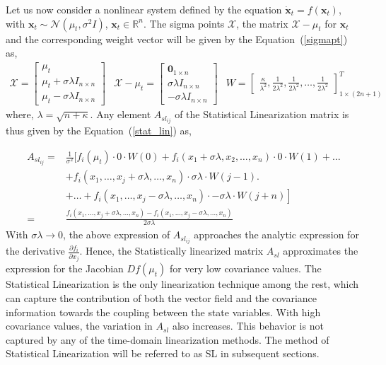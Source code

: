Let us now consider a nonlinear system defined by the equation $\dot{\textbf{x}}_t = f(\textbf{x}_t)$, with $\textbf{x}_t \sim \mathcal{N}(\mu_t,\sigma^2 I)$, $\textbf{x}_t \in \mathbb{R}^n$. The sigma points $\mathcal{X}$, the matrix $\mathcal{X} -\mu_t$ for $\textbf{x}_t$ and the corresponding weight vector will be given by the Equation~(\ref{sigmapt}) as,
\begin{equation}
\begin{array}{lcr}
\mathcal{X} = \begin{bmatrix}
\mu_t \\
\mu_t + \sigma  \lambda I_{n \times n} \\
\mu_t - \sigma \lambda I_{n \times n}
\end{bmatrix} &
\mathcal{X} - \mu_t =  \begin{bmatrix}
\textbf{0}_{1 \times n} \\
\sigma \lambda I_{n \times n} \\
- \sigma \lambda I_{n \times n}
\end{bmatrix}  &
 W = \begin{bmatrix}
\frac{\kappa}{\lambda^2}, \frac{1}{2\lambda^2}, \frac{1}{2\lambda^2}, \ldots , \frac{1}{2\lambda^2}
\end{bmatrix}^T_{1 \times (2n + 1)}
\end{array}
\end{equation} 
\noindent where, $\lambda = \sqrt{n+ \kappa}$. Any element $A_{{sl}_{ij}}$ of the Statistical Linearization matrix is thus given by the Equation~(\ref{stat_lin}) as,

\begin{equation}
\begin{array}{rl}
A_{{sl}_{ij}} = & \frac{1}{\sigma^2} \bigl[f_i(\mu_t)\cdot 0 \cdot W(0) + f_i(x_1 + \sigma \lambda,x_2,\ldots,x_n)\cdot 0 \cdot W(1) + \ldots \\
& + f_i(x_1 ,\ldots,x_j + \sigma \lambda,\ldots, x_n)\cdot \sigma \lambda \cdot W(j-1) \bigr.\\
& \left. + \ldots + f_i(x_1 ,\ldots,x_j - \sigma \lambda,\ldots, x_n) \cdot - \sigma \lambda \cdot W(j + n) \right] \\
= & \frac{f_i(x_1 ,\ldots,x_j + \sigma \lambda,\ldots, x_n) - f_i(x_1 ,\ldots,x_j - \sigma \lambda,\ldots, x_n)}{2 \sigma \lambda}
\end{array}
\end{equation}
\noindent With $\sigma \lambda \rightarrow 0$, the above expression of $A_{{sl}_{ij}}$ approaches the analytic expression for the derivative $\frac{\partial f_i}{\partial x_j}$. Hence, the Statistically linearized matrix $A_{sl}$ approximates the expression for the Jacobian $Df(\mu_t)$ for very low covariance values. 
 The Statistical Linearization is the only linearization technique among the rest, which can capture the contribution of both the vector field and the covariance information towards the coupling between the state variables. With high covariance values, the variation in $A_{sl}$ also increases. This behavior is not captured by any of the time-domain linearization methods. The method of Statistical Linearization will be referred to as SL in subsequent sections. 
 
